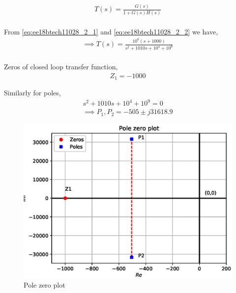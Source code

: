 \begin{enumerate}[label=\arabic*.,ref=\theenumi]
\begin{align}
    T(s) = \frac{G(s)}{1 + G(s)H(s)}
    \\
\end{align}

From \eqref{eq:ee18btech11028_2_1} and \eqref{eq:ee18btech11028_2_2} we have,
\begin{align}
    \implies T(s) = \frac{10^{6}(s+1000)}{s^{2} + 1010s + 10^{4} + 10^{9}}
    \\
     \label{eq:ee18btech11028_2_3}
\end{align}

Zeros of closed loop transfer function,
\begin{align}
    Z_{1} = -1000
\end{align}

Similarly for poles,
\begin{align}
    s^{2} + 1010s + 10^{4} + 10^{9} = 0
    \\
    \implies P_{1}, P_{2} = -505 \pm j31618.9
\end{align}

\begin{figure}[!ht]
    \centering
    \includegraphics[width=\columnwidth]{./figs/ee18btech11028/fig_3.eps}
    \caption{Pole zero plot}
    \label{fig:ee18btech11028_2_3}
\end{figure}



\end{enumerate}
